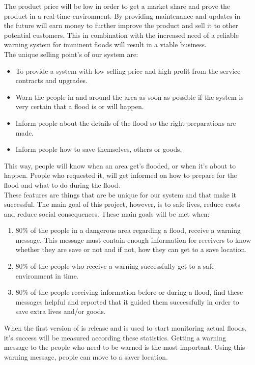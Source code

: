 The product price will be low in order to get a market share and prove the product in a real-time environment. By providing maintenance and updates in the future \CompanyName will earn money to further improve the product and sell it to other potential customers. This in combination with the increased need of a reliable warning system for imminent floods will result in a viable business.\\


The unique selling point{'}s of our system are: 
\begin{itemize}
	\item To provide a system with low selling price and high profit from the service contracts and upgrades.
	\item Warn the people in and around the area as soon as possible if the system is very certain that a flood is or will happen.
	\item Inform people about the details of the flood so the right preparations are made. 
	\item Inform people how to save themselves, others or goods.
\end{itemize}

This way, people will know when an area get{'}s flooded, or when it's about to happen. People who requested it, will get informed on how to prepare for the flood and what to do during the flood.\\
These features are things that are be unique for our system and that make it successful. The main goal of this project, however, is to safe lives, reduce costs and reduce social consequences. These main goals will be met when:
\begin{enumerate}
	\item 80\% of the people in a dangerous area regarding a flood, receive a warning message. This message must contain enough information for receivers to know whether they are save or not and if not, how they can get to a save location.
	\item 80\% of the people who receive a warning successfully get to a safe environment in time.
	\item 80\% of the people receiving information before or during a flood, find these messages helpful and reported that it guided them successfully in order to save extra lives and/or goods.
\end{enumerate}

When the first version of \ProjectName is release and is used to start monitoring actual floods, it's success will be measured according these statistics. Getting a warning message to the people who need to be warned is the most important. Using this warning message, people can move to a saver location.

